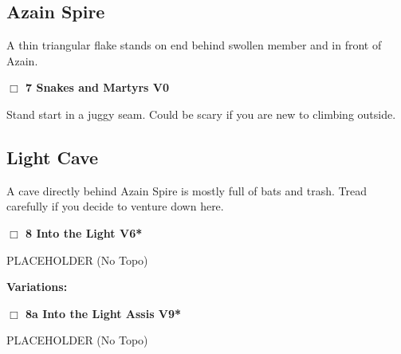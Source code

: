 \begin{multicols}{2}
\needspace{10em}
\subsection*{Azain Spire}\label{bf:Azain Spire}

A thin triangular flake stands on end behind swollen member and in front of Azain.\\



\needspace{2em}
\label{rt:Snakes and Martyrs}
\colorbox{green!20}{
\parbox{0.95\linewidth}{
\hspace{-1ex}\textbf{$\Box$
7 Snakes and Martyrs V0  
}}}
\begin{adjustwidth}{1.3em}{}			

 Stand start in a juggy seam. Could be scary if you are new to climbing outside.
\end{adjustwidth}





\needspace{10em}
\subsection*{Light Cave}\label{bf:Light Cave}

A cave directly behind Azain Spire is mostly full of bats and trash. Tread carefully if you decide to venture down here.\\



\needspace{2em}
\label{rt:Into the Light}
\colorbox{RoyalBlue!20}{
\parbox{0.95\linewidth}{
\hspace{-1ex}\textbf{$\Box$
8 Into the Light V6*  
}}}
\begin{adjustwidth}{1.3em}{}			

PLACEHOLDER
  (No Topo)
\end{adjustwidth}


\begin{adjustwidth}{0.5cm}{}				
\needspace{4em}
\textbf{Variations:} \newline

\needspace{2em}
\label{vr:Into the Light Assis}
\colorbox{Goldenrod!20}{
\parbox{0.95\linewidth}{
\hspace{-1ex}\textbf{$\Box$
8a Into the Light Assis V9*  
}}}
\begin{adjustwidth}{1.3em}{}			

PLACEHOLDER
  (No Topo)
\end{adjustwidth}




\end{adjustwidth}
\end{multicols}
